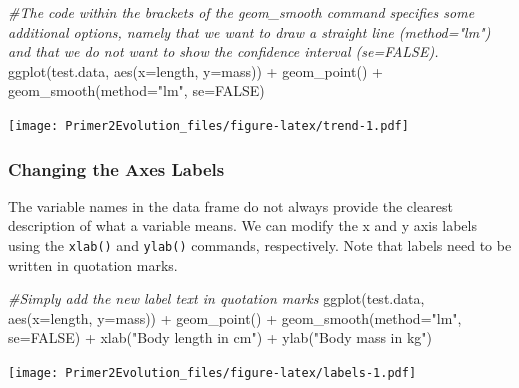 \documentclass[
]{book}
\newenvironment{Shaded}{\begin{snugshade}}{\end{snugshade}}
\newcommand{\AttributeTok}[1]{\textcolor[rgb]{0.77,0.63,0.00}{#1}}
\newcommand{\CommentTok}[1]{\textcolor[rgb]{0.56,0.35,0.01}{\textit{#1}}}
\newcommand{\ConstantTok}[1]{\textcolor[rgb]{0.00,0.00,0.00}{#1}}
\newcommand{\FunctionTok}[1]{\textcolor[rgb]{0.00,0.00,0.00}{#1}}
\newcommand{\NormalTok}[1]{#1}
\newcommand{\SpecialCharTok}[1]{\textcolor[rgb]{0.00,0.00,0.00}{#1}}
\newcommand{\StringTok}[1]{\textcolor[rgb]{0.31,0.60,0.02}{#1}}
\begin{document}
\begin{Shaded}
\begin{Highlighting}[]
\CommentTok{\#The code within the brackets of the geom\_smooth command specifies some additional options, namely that we want to draw a straight line (method="lm") and that we do not want to show the confidence interval (se=FALSE).}
\FunctionTok{ggplot}\NormalTok{(test.data, }\FunctionTok{aes}\NormalTok{(}\AttributeTok{x=}\NormalTok{length, }\AttributeTok{y=}\NormalTok{mass)) }\SpecialCharTok{+}
  \FunctionTok{geom\_point}\NormalTok{() }\SpecialCharTok{+}
  \FunctionTok{geom\_smooth}\NormalTok{(}\AttributeTok{method=}\StringTok{"lm"}\NormalTok{, }\AttributeTok{se=}\ConstantTok{FALSE}\NormalTok{)}
\end{Highlighting}
\end{Shaded}

\texttt{[image: Primer2Evolution\_files/figure-latex/trend-1.pdf]}

\hypertarget{changing-the-axes-labels}{%
\subsubsection*{Changing the Axes Labels}\label{changing-the-axes-labels}}

The variable names in the data frame do not always provide the clearest description of what a variable means. We can modify the x and y axis labels using the \texttt{xlab()} and \texttt{ylab()} commands, respectively. Note that labels need to be written in quotation marks.

\begin{Shaded}
\begin{Highlighting}[]
\CommentTok{\#Simply add the new label text in quotation marks}
\FunctionTok{ggplot}\NormalTok{(test.data, }\FunctionTok{aes}\NormalTok{(}\AttributeTok{x=}\NormalTok{length, }\AttributeTok{y=}\NormalTok{mass)) }\SpecialCharTok{+}
  \FunctionTok{geom\_point}\NormalTok{() }\SpecialCharTok{+}
  \FunctionTok{geom\_smooth}\NormalTok{(}\AttributeTok{method=}\StringTok{"lm"}\NormalTok{, }\AttributeTok{se=}\ConstantTok{FALSE}\NormalTok{) }\SpecialCharTok{+}
  \FunctionTok{xlab}\NormalTok{(}\StringTok{"Body length in cm"}\NormalTok{) }\SpecialCharTok{+}
  \FunctionTok{ylab}\NormalTok{(}\StringTok{"Body mass in kg"}\NormalTok{)}
\end{Highlighting}
\end{Shaded}

\texttt{[image: Primer2Evolution\_files/figure-latex/labels-1.pdf]}
\end{document}
